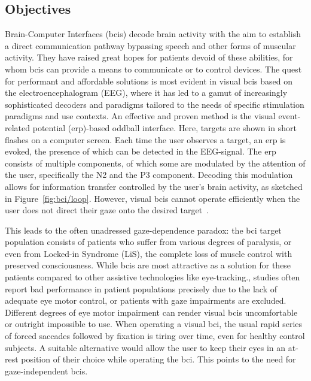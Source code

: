 \subsection{Objectives}

Brain-Computer Interfaces (\ac{bci}s) decode brain activity with the aim to establish a direct communication
pathway bypassing speech and other forms of muscular activity. They have raised great hopes for patients
devoid of these abilities, for whom \ac{bci}s can provide a means to communicate or to
control devices.
The quest for performant and affordable solutions is most evident in
visual \ac{bci}s based on the electroencephalogram (EEG), where it has led to a gamut of increasingly sophisticated decoders
and paradigms tailored to the needs of specific stimulation paradigms and
use contexts.
An effective and proven method is the visual event-related potential (\ac{erp})-based
oddball interface.
Here, targets are shown in short flashes on a computer screen.
Each time the user observes a target, an \ac{erp} is evoked, the presence of which can be
detected in the EEG-signal.
The \ac{erp} consists of multiple components, of which some are modulated by the
attention of the user, specifically the N2 and the P3 component.
Decoding this modulation allows for information transfer controlled by the
user's brain activity, as sketched in Figure~\ref{fig:bci/loop}.
However, visual \ac{bci}s cannot operate efficiently when the user does not direct
their gaze onto the desired target~\cite{Brunner2010, Frenzel2011}.

This leads to the often unadressed gaze-dependence paradox: the \ac{bci} target
population consists of patients who suffer from various degrees
of paralysis, or even from Locked-in Syndrome (LiS), the complete loss of muscle
control with preserved consciousness.
While \ac{bci}s are most attractive as a solution for these patients
compared to other assistive technologies like eye-tracking., studies often
report bad performance in patient populations precisely due to the lack of adequate eye motor
control, or patients with gaze impairments are excluded.
Different degrees of eye motor impairment can render visual \ac{bci}s
uncomfortable or outright impossible to use.
When operating a visual \ac{bci}, the usual rapid series of forced saccades followed
by fixation is tiring over time, even for healthy control subjects.
A suitable alternative would allow the user to keep their eyes in an at-rest
position of their choice while operating the \ac{bci}.
This points to the need for gaze-independent \ac{bci}s.

